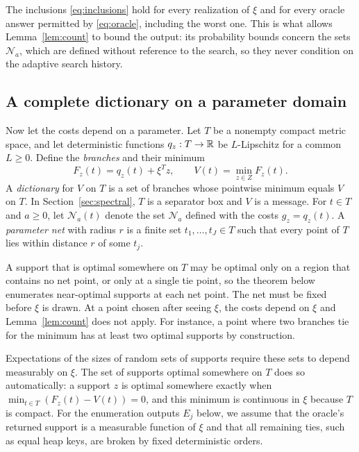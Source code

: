 The inclusions \eqref{eq:inclusions} hold for every realization of $\xi$
and for every oracle answer permitted by \eqref{eq:oracle}, including the
worst one. This is what allows Lemma~\ref{lem:count} to bound the output:
its probability bounds concern the sets $\mathcal N_a$, which are
defined without reference to the search, so they never condition on the
adaptive search history.

\subsection{A complete dictionary on a parameter domain}
Now let the costs depend on a parameter. Let $T$ be a nonempty compact
metric space, and let deterministic functions $q_z:T\to\mathbb R$ be
$L$-Lipschitz for a common $L\ge0$. Define the \emph{branches} and their
minimum
\[
 F_z(t)=q_z(t)+\xi^Tz,\qquad V(t)=\min_{z\in Z}F_z(t).
\]
A \emph{dictionary} for $V$ on $T$ is a set of branches whose pointwise
minimum equals $V$ on $T$. In Section~\ref{sec:spectral}, $T$ is a
separator box and $V$ is a message. For $t\in T$ and $a\ge0$, let
$\mathcal N_a(t)$ denote the set $\mathcal N_a$ defined with the costs
$g_z=q_z(t)$. A \emph{parameter net} with radius $r$ is a finite set
$t_1,\ldots,t_J\in T$ such that every point of $T$ lies within distance
$r$ of some $t_j$.

A support that is optimal somewhere on $T$ may be optimal only on a
region that contains no net point, or only at a single tie point, so the
theorem below enumerates near-optimal supports at each net point. The
net must be fixed before $\xi$ is drawn. At a point chosen after seeing
$\xi$, the costs depend on $\xi$ and Lemma~\ref{lem:count} does not
apply. For instance, a point where two branches tie for the minimum has
at least two optimal supports by construction.

Expectations of the sizes of random sets of supports require these sets
to depend measurably on $\xi$. The set of supports optimal somewhere on
$T$ does so automatically: a support $z$ is optimal somewhere exactly when
$\min_{t\in T}(F_z(t)-V(t))=0$, and this minimum is continuous in $\xi$
because $T$ is compact. For the enumeration outputs $E_j$ below, we assume
that the oracle's returned support is a measurable function of $\xi$ and
that all remaining ties, such as equal heap keys, are broken by fixed
deterministic orders.

